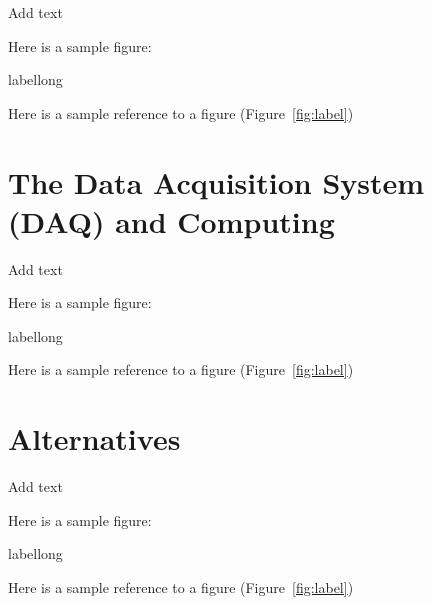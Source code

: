 Add text

Here is a sample figure: 

\begin{cdrfigure}[short]{label}{long}
\end{cdrfigure}


Here is a sample reference to a figure (Figure~\ref{fig:label})


\section{The Data Acquisition System (DAQ) and Computing}
\label{sec:detectors-nd-ref-daq-comp}

Add text

Here is a sample figure: 

\begin{cdrfigure}[short]{label}{long}
\end{cdrfigure}


Here is a sample reference to a figure (Figure~\ref{fig:label})

\section{Alternatives}
\label{sec:detectors-nd-alt}

Add text

Here is a sample figure: 

\begin{cdrfigure}[short]{label}{long}
\end{cdrfigure}


Here is a sample reference to a figure (Figure~\ref{fig:label})

